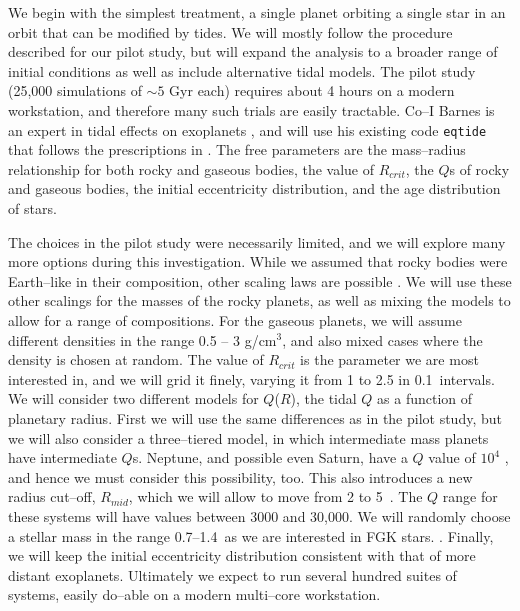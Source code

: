 \medskip
{\centerline{}}
\smallskip

We begin with the simplest treatment, a single planet orbiting a
single star in an orbit that can be modified by tides.  We will mostly
follow the procedure described for our pilot study, but will expand
the analysis to a broader range of initial conditions as well as
include alternative tidal models.  The pilot study (25,000 simulations
of $\sim 5$ Gyr each) requires about 4 hours on a modern workstation,
and therefore many such trials are easily tractable.  Co--I Barnes is
an expert in tidal effects on exoplanets
\citep{Barnes08,Jackson08,Barnes09,Barnes13}, and will use his
existing code \texttt{eqtide} that follows the prescriptions in
\cite{Barnes13}.  The free parameters are the mass--radius
relationship for both rocky and gaseous bodies, the value of
$R_{crit}$, the $Q$s of rocky and gaseous bodies, the initial
eccentricity distribution, and the age distribution of \kepler stars.

The choices in the pilot study were necessarily limited, and we will
explore many more options during this investigation.  While we assumed that
rocky bodies were Earth--like in their composition, other scaling laws
are possible \citep[e.g.][]{Seager07,Fortney07,Lissauer11}.  We will
use these other scalings for the masses of the rocky planets, as well
as mixing the models to allow for a range of compositions.  For the
gaseous planets, we will assume different densities in the range 0.5
-- 3 g/cm$^3$, and also mixed cases where the density is chosen at
random.  The value of $R_{crit}$ is the parameter we are most
interested in, and we will grid it finely, varying it from 1 to 2.5
\rearth in 0.1~\rearth intervals.  We will consider two different
models for $Q$($R$), the tidal $Q$ as a function of planetary radius.
First we will use the same differences as in the pilot study, but we
will also consider a three--tiered model, in which intermediate mass
planets have intermediate $Q$s.  Neptune, and possible even Saturn,
have a $Q$ value of $10^4$ \citep{ZhangHamilton08,Lainey12}, and hence
we must consider this possibility, too.  This also introduces a new
radius cut--off, $R_{mid}$, which we will allow to move from 2 to
5~\rearth.  The $Q$ range for these systems will have values between
3000 and 30,000.  We will randomly choose a stellar mass in the range
0.7--1.4~\msun as we are interested in FGK stars.  . Finally, we will keep the initial eccentricity
distribution consistent with that of more distant exoplanets.
Ultimately we expect to run several hundred suites of systems, easily
do--able on a modern multi--core workstation.

